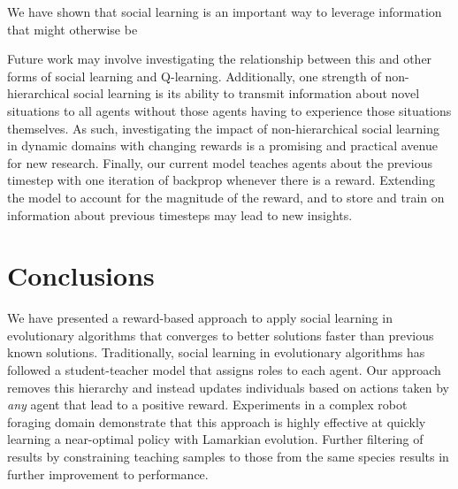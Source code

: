 \documentclass{acm_proc_article-sp}
\begin{document}
We have shown that social learning is an important way to leverage information that might otherwise be 

Future work may involve investigating the relationship between this and other forms of social learning and Q-learning.  Additionally, one strength of non-hierarchical social learning is its ability to transmit information about novel situations to all agents without those agents having to experience those situations themselves.  As such, investigating the impact of non-hierarchical social learning in dynamic domains with changing rewards is a promising and practical avenue for new research.  Finally, our current model teaches agents about the previous timestep with one iteration of backprop whenever there is a reward.  Extending the model to account for the magnitude of the reward, and to store and train on information about previous timesteps may lead to new insights.   

\section{Conclusions}
\label{sec:conclusions}

We have presented a reward-based approach to apply social learning in evolutionary algorithms that converges to better solutions faster than previous known solutions. Traditionally, social learning in evolutionary algorithms has followed a student-teacher model that assigns roles to each agent. Our approach removes this hierarchy and instead updates individuals based on actions taken by \textit{any} agent that lead to a positive reward. Experiments in a complex robot foraging domain demonstrate that this approach is highly effective at quickly learning a near-optimal policy with Lamarkian evolution.  Further filtering of results by constraining teaching samples to those from the same species results in further improvement to performance.



\end{document}
